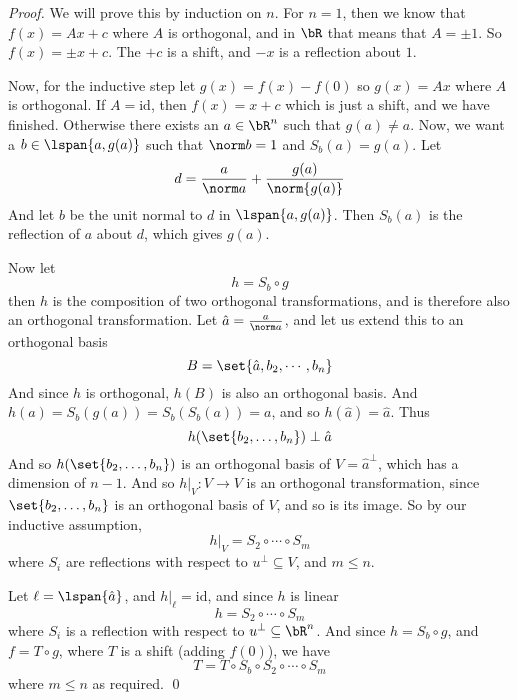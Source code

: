 \begin{proof}

    We will prove this by induction on $n$.
    For $n=1$, then we know that $f(x)=Ax+c$ where $A$ is orthogonal, and in $\bR$ that means that $A=\pm1$.
    So $f(x)=\pm x+c$.
    The $+c$ is a shift, and $-x$ is a reflection about $1$.

    Now, for the inductive step let $g(x)=f(x)-f(0)$ so $g(x)=Ax$ where $A$ is orthogonal.
    If $A=\mathrm{id}$, then $f(x)=x+c$ which is just a shift, and we have finished.
    Otherwise there exists an $a\in\bR^n$ such that $g(a)\neq a$.
    Now, we want a $b\in\lspan{a,g(a)}$ such that $\norm b=1$ and $S_b(a)=g(a)$.
    Let
    \[ d = \frac a{\norm a}+\frac{g(a)}{\norm{g(a)}} \]
    And let $b$ be the unit normal to $d$ in $\lspan{a,g(a)}$.
    Then $S_b(a)$ is the reflection of $a$ about $d$, which gives $g(a)$.

    Now let
    \[ h = S_b\circ g \]
    then $h$ is the composition of two orthogonal transformations, and is therefore also an orthogonal transformation.
    Let $\hat a=\frac a{\norm a}$, and let us extend this to an orthogonal basis
    \[ B = \set{\hat a,b_2,\cdots,b_n} \]
    And since $h$ is orthogonal, $h(B)$ is also an orthogonal basis.
    And $h(a)=S_b(g(a))=S_b(S_b(a))=a$, and so $h(\hat a)=\hat a$.
    Thus
    \[ h(\set{b_2,\dots,b_n})\perp\hat a \]
    And so $h(\set{b_2,\dots,b_n})$ is an orthogonal basis of $V=\hat a^\perp$, which has a dimension of $n-1$.
    And so $h\bigl\vert_V\colon V\to V$ is an orthogonal transformation, since $\set{b_2,\dots,b_n}$ is an orthogonal basis of $V$, and so is its image.
    So by our inductive assumption,
    \[ h\bigl\vert_V = S_2\circ\cdots\circ S_m \]
    where $S_i$ are reflections with respect to $u^\perp\subseteq V$, and $m\leq n$.

    Let $\ell=\lspan{\hat a}$, and $h\bigl\vert_\ell=\mathrm{id}$, and since $h$ is linear
    \[ h = S_2\circ\cdots\circ S_m \]
    where $S_i$ is a reflection with respect to $u^\perp\subseteq\bR^n$.
    And since $h=S_b\circ g$, and $f=T\circ g$, where $T$ is a shift (adding $f(0)$), we have
    \[ T = T\circ S_b\circ S_2\circ\cdots\circ S_m \]
    where $m\leq n$ as required.
    \qed

\end{proof}


